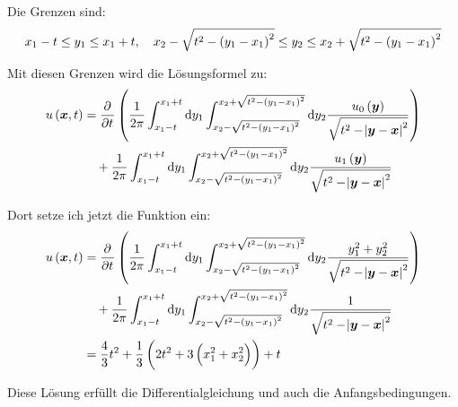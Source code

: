 \documentclass[11pt, ngerman, fleqn]{article}
\renewcommand{\vec}[1]{\boldsymbol{#1}}
\begin{document}
Die Grenzen sind:
\[
	x_1 - t \leq y_1 \leq x_1 + t
	,\quad
	x_2 - \sqrt{t^2-\del{y_1 - x_1}^2} \leq y_2 \leq x_2 + \sqrt{t^2-\del{y_1 - x_1}^2}
\]

Mit diesen Grenzen wird die Lösungsformel zu:
\begin{align*}
	u\del{\vec x, t} &= \dpd{}t \del{
		\frac{1}{2 \pi}
		\int_{x_1 - t}^{x_1 + t} \dif y_1
		\int_{x_2 - \sqrt{t^2-\del{y_1 - x_1}^2}}^{x_2 + \sqrt{t^2-\del{y_1 - x_1}^2}} \dif y_2
		\frac{u_0\del{\vec y}}{\sqrt{t^2 - \abs{\vec y - \vec x}^2}}
	} \\
	&\quad+
	\frac{1}{2 \pi}
	\int_{x_1 - t}^{x_1 + t} \dif y_1
	\int_{x_2 - \sqrt{t^2-\del{y_1 - x_1}^2}}^{x_2 + \sqrt{t^2-\del{y_1 - x_1}^2}} \dif y_2
	\frac{u_1\del{\vec y}}{\sqrt{t^2 - \abs{\vec y - \vec x}^2}}
\end{align*}

Dort setze ich jetzt die Funktion ein:
\begin{align*}
	u\del{\vec x, t} &= \dpd{}t \del{
		\frac{1}{2 \pi}
		\int_{x_1 - t}^{x_1 + t} \dif y_1
		\int_{x_2 - \sqrt{t^2-\del{y_1 - x_1}^2}}^{x_2 + \sqrt{t^2-\del{y_1 - x_1}^2}} \dif y_2
		\frac{y_1^2 + y_2^2}{\sqrt{t^2 - \abs{\vec y - \vec x}^2}}
	} \\
	&\quad+
	\frac{1}{2 \pi}
	\int_{x_1 - t}^{x_1 + t} \dif y_1
	\int_{x_2 - \sqrt{t^2-\del{y_1 - x_1}^2}}^{x_2 + \sqrt{t^2-\del{y_1 - x_1}^2}} \dif y_2
	\frac{1}{\sqrt{t^2 - \abs{\vec y - \vec x}^2}} \\
	&= \frac 43 t^2 + \frac 13 \del{2t^2 + 3 \del{x_1^2 + x_2^2}} + t
\end{align*}

Diese Lösung erfüllt die Differentialgleichung und auch die Anfangsbedingungen.

%
%
\end{document}
